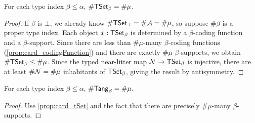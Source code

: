 \begin{proposition}
  \label{prop:card_tSet}
  For each type index \( \beta \leq \alpha \), \( \#\mathsf{TSet}_\beta = \#\mu \).
\end{proposition}
\begin{proof}
  If \( \beta \) is \( \bot \), we already know \( \#\mathsf{TSet}_\bot = \#{\mathcal A} = \#\mu \), so suppose \( \#\beta \) is a proper type index.
  Each object \( x : \mathsf{TSet}_\beta \) is determined by a \( \beta \)-coding function and a \( \beta \)-support.
  Since there are less than \( \#\mu \)-many \( \beta \)-coding functions (\cref{prop:card_codingFunction}) and there are exactly \( \#\mu \) \( \beta \)-supports, we obtain \( \#\mathsf{TSet}_\beta \leq \#\mu \).
  Since the typed near-litter map \( {\mathcal N} \to \mathsf{TSet}_\beta \) is injective, there are at least \( \#{\mathcal N} = \#\mu \) inhabitants of \( \mathsf{TSet}_\beta \), giving the result by antisymmetry.
\end{proof}
\begin{proposition}
  \label{prop:card_tangle}
  For each type index \( \beta \leq \alpha \), \( \#\mathsf{Tang}_\beta = \#\mu \).
\end{proposition}
\begin{proof}
  Use \cref{prop:card_tSet} and the fact that there are precisely \( \#\mu \)-many \( \beta \)-supports.
\end{proof}
